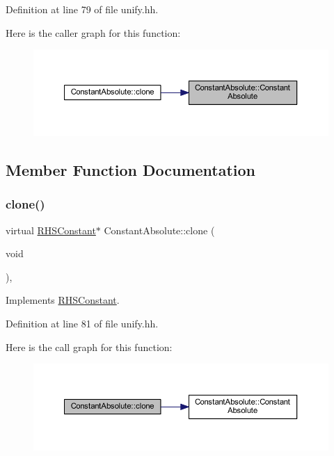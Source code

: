 Definition at line 79 of file unify.\+hh.

Here is the caller graph for this function\+:
\nopagebreak
\begin{figure}[H]
\begin{center}
\leavevmode
\includegraphics[width=350pt]{class_constant_absolute_a08cfb1053deedf291aed99b0510a7e31_icgraph}
\end{center}
\end{figure}


\subsection{Member Function Documentation}
\mbox{\label{class_constant_absolute_abc264546b0dde5e9c02777367aa00424}} 
\subsubsection{\texorpdfstring{clone()}{clone()}}
{\footnotesize\ttfamily virtual \mbox{\hyperlink{class_r_h_s_constant}{R\+H\+S\+Constant}}$\ast$ Constant\+Absolute\+::clone (\begin{DoxyParamCaption}\item[{void}]{ }\end{DoxyParamCaption})\hspace{0.3cm}{\ttfamily [inline]}, {\ttfamily [virtual]}}



Implements \mbox{\hyperlink{class_r_h_s_constant_a3e43335a89351a453932a8c0544d5722}{R\+H\+S\+Constant}}.



Definition at line 81 of file unify.\+hh.

Here is the call graph for this function\+:
\nopagebreak
\begin{figure}[H]
\begin{center}
\leavevmode
\includegraphics[width=350pt]{class_constant_absolute_abc264546b0dde5e9c02777367aa00424_cgraph}
\end{center}
\end{figure}
\mbox{\label{class_constant_absolute_ae393b6b03f852d82b28c8bf29ea094c2}} 
